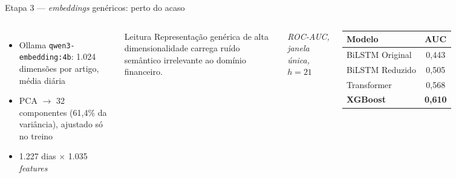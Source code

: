 \documentclass[10pt,aspectratio=169]{beamer}
\begin{document}
\begin{frame}{Etapa 3 --- \textit{embeddings} genéricos: perto do acaso}
  \begin{columns}[T]
    \begin{itemize}
      \item Ollama \texttt{qwen3-embedding:4b}: 1.024 dimensões por artigo, média diária
      \item PCA $\to$ 32 componentes (61{,}4\% da variância), ajustado só no treino
      \item 1.227 dias $\times$ 1.035 \textit{features}
    \end{itemize}
    \vspace{1ex}
    \begin{block}{Leitura}
      Representação genérica de alta dimensionalidade carrega ruído
      semântico irrelevante ao domínio financeiro.
    \end{block}
    \begin{table}
      \footnotesize
      {\scriptsize\itshape ROC-AUC, janela única, $h=21$}\\[0.5ex]
      \begin{tabular}{lc}
        \toprule
        \textbf{Modelo} & \textbf{AUC} \\
        \midrule
        BiLSTM Original & 0{,}443 \\
        BiLSTM Reduzido & 0{,}505 \\
        Transformer     & 0{,}568 \\
        \textbf{XGBoost} & \textbf{0{,}610} \\
        \bottomrule
      \end{tabular}
    \end{table}
  \end{columns}
\end{frame}
\end{document}
